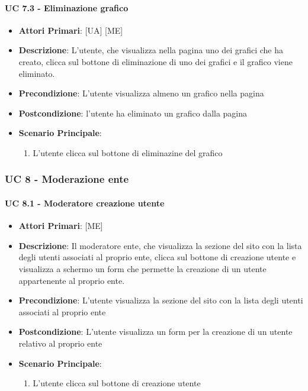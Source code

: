 			\paragraph{UC 7.3 - Eliminazione grafico}
			\begin{itemize}
				\item \textbf{Attori Primari}: [UA] [ME]
				\item \textbf{Descrizione}: L'utente, che visualizza nella pagina uno dei grafici che ha creato, clicca sul bottone di eliminazione di uno dei grafici e il grafico viene eliminato.
				\item \textbf{Precondizione}: L'utente visualizza almeno un grafico nella pagina
				\item \textbf{Postcondizione}: l'utente ha eliminato un grafico dalla pagina
				\item \textbf{Scenario Principale}:
				\begin{enumerate}
					\item{L'utente clicca sul bottone di eliminazine del grafico}
				\end{enumerate}	
			\end{itemize}

		\subsubsection{UC 8 - Moderazione ente}

		\paragraph{UC 8.1 - Moderatore creazione utente }
			\begin{itemize}
				\item \textbf{Attori Primari}: [ME]
				\item \textbf{Descrizione}: Il moderatore ente, che visualizza la sezione del sito con la lista degli utenti associati al proprio ente, clicca sul bottone di creazione utente e visualizza a schermo un form che permette la creazione di un utente appartenente al proprio ente.
				\item \textbf{Precondizione}: L'utente visualizza la sezione del sito con la lista degli utenti associati al proprio ente
				\item \textbf{Postcondizione}: L'utente visualizza un form per la creazione di un utente relativo al proprio ente
				\item \textbf{Scenario Principale}:
				\begin{enumerate}
					\item{L'utente clicca sul bottone di creazione utente}
				\end{enumerate}	
			\end{itemize}
		
